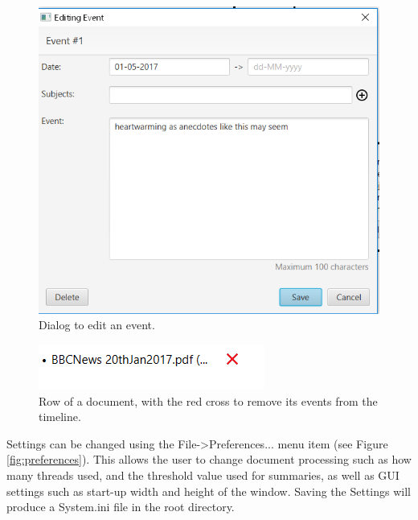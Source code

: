 \begin{figure}[H]
\caption{Dialog to edit an event.}
\label{fig:editEvent}
\includegraphics{editEvent.PNG}
\centering
\end{figure}

\begin{figure}[H]
\caption{Row of a document, with the red cross to remove its events from the timeline.}
\label{fig:removeDoc}
\includegraphics{removeDoc.PNG}
\centering
\end{figure}

\par Settings can be changed using the File->Preferences... menu item (see Figure \ref{fig:preferences}). This allows the user to change document processing such as how many threads used, and the threshold value used for summaries, as well as GUI settings such as start-up width and height of the window. Saving the Settings will produce a System.ini file in the root directory.

